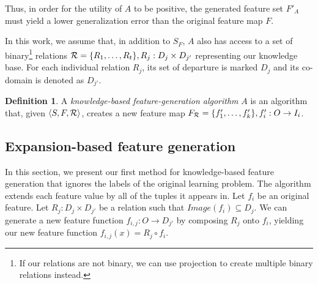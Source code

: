 \documentclass[letterpaper]{article} %
\theoremstyle{definition}
\newtheorem{defn}{Definition}
\begin{document}
Thus, in order for the utility of $A$ to be positive, the generated feature set $F'_A$ must yield a lower generalization error than the original feature map $F$.

In this work, we assume that, in addition to $S_F$, $A$ also has access to a set of binary\footnote{If our relations are not binary, we can use projection to create multiple binary relations instead.} relations ${\cal R}=\{R_{1},\ldots,R_{t}\}, R_j:D_j\times D_{j'}$ representing our knowledge base. For each individual relation $R_j$, its set of departure is marked $D_j$ and its co-domain is denoted as $D_{j'}$. 
\begin{defn}
	A \emph{knowledge-based feature-generation algorithm} $A$ is an algorithm that, given $\langle S,F,{\cal R} \rangle$, creates a new feature map $F_{{\cal R}}=\{f'_{1},\ldots,f'_{k}\}, f'_{i}:O\rightarrow I_i$.
\end{defn}


\subsection{Expansion-based feature generation} \label{shallow_section}

In this section, we present our first method for knowledge-based feature generation that ignores the labels of the original learning problem.
The algorithm extends each feature value by all of the tuples it appears in.
Let $f_i$ be an original feature. Let $R_j:D_j\times D_{j'}$ be a relation such that  $Image(f_i) \subseteq D_j$. We can generate a new feature function $f_{i,j}:O\rightarrow D_{j'}$ by composing $R_j$ onto $f_i$, yielding our new feature function  $f_{i,j}(x)=R_j\circ f_i$.

\end{document}
